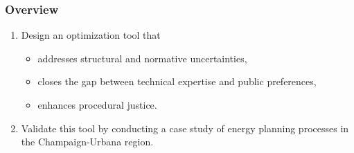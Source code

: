 \begin{frame}
    \frametitle{Overview}

    \begin{enumerate}
        \item Design an optimization tool that
        \begin{itemize}
            \item addresses structural and normative uncertainties,
            \item closes the gap between technical expertise and public preferences,
            \item enhances procedural justice.
        \end{itemize}
        \item Validate this tool by conducting a case study of energy planning processes
        in the Champaign-Urbana region.
    \end{enumerate}

\end{frame}